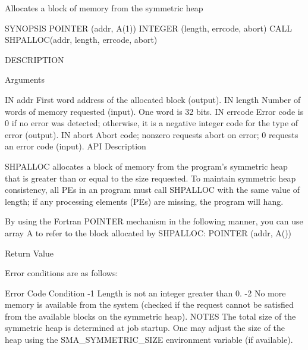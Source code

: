        Allocates a block of memory from the symmetric heap

SYNOPSIS
       POINTER (addr, A(1))
       INTEGER (length, errcode, abort)
       CALL SHPALLOC(addr, length, errcode, abort)

DESCRIPTION

Arguments

	IN       addr	      First word address of the allocated block (output).
       IN	length	      Number  of  words of memory requested (input).  One word
		      is 32 bits.
       IN	errcode	      Error code is 0 if no error was detected; otherwise,  it
		      is  a  negative  integer	code  for  the	type  of error
		      (output).
       IN	abort	      Abort code; nonzero requests abort on error; 0  requests
		      an error code (input).
API Description

       SHPALLOC	 allocates a block of memory from the program's symmetric heap
       that is greater than or equal  to  the  size  requested.	  To  maintain
       symmetric  heap	consistency,  all PEs in an program must call SHPALLOC
       with the same value of length; if any  processing  elements  (PEs)  are
       missing, the program will hang.


       By using the Fortran POINTER mechanism in the following manner, you can
       use array A to refer to the block allocated by SHPALLOC: POINTER (addr,
       A())

Return Value

       Error conditions are as follows:

       Error Code     Condition
	     -1	      Length is not an integer greater than 0.
	     -2	      No more memory is available from the system (checked  if
		      the  request  cannot  be	satisfied  from	 the available
		      blocks on the symmetric heap).
NOTES
       The total size of the symmetric heap is determined at job startup.  One
       may  adjust  the	 size  of  the	heap  using   the   SMA_SYMMETRIC_SIZE
       environment  variable (if available).	


